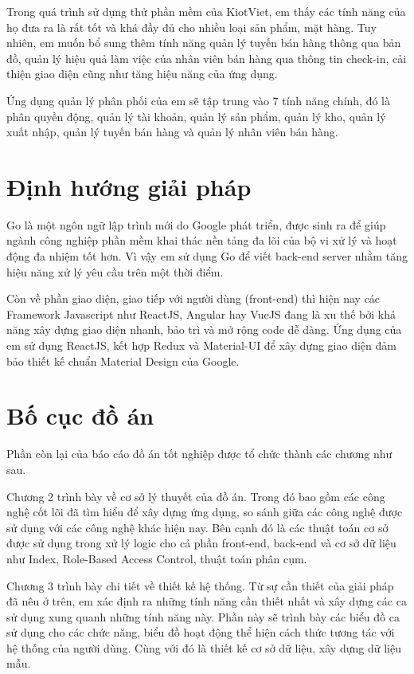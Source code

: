 Trong quá trình sử dụng thử phần mềm của KiotViet, em thấy các tính năng của
họ đưa ra là rất tốt và khá đầy đủ cho nhiều loại sản phẩm, mặt hàng.
Tuy nhiên, em muốn bổ sung thêm tính năng quản lý tuyến bán hàng
thông qua bản đồ, quản lý hiệu quả làm việc của nhân viên
bán hàng qua thông tin check-in, cải thiện giao diện cũng
như tăng hiệu năng của ứng dụng. 

Ứng dụng quản lý phân phối của em sẽ tập trung vào 7 tính năng chính,
đó là phân quyền động, quản lý tài khoản, quản lý sản phẩm, quản lý kho,
quản lý xuất nhập, quản lý tuyến bán hàng và quản lý nhân viên bán hàng.

\section{Định hướng giải pháp}
Go là một ngôn ngữ lập trình mới do Google phát triển,
được sinh ra để giúp ngành công nghiệp phần mềm khai thác nền
tảng đa lõi của bộ vi xử lý và hoạt động đa nhiệm tốt hơn.
Vì vậy em sử dụng Go để viết back-end server nhằm tăng hiệu
năng xử lý yêu cầu trên một thời điểm.

Còn về phần giao diện, giao tiếp với người dùng (front-end) thì hiện
nay các Framework Javascript như ReactJS, Angular hay VueJS đang
là xu thế bởi khả năng xây dựng giao diện nhanh, bảo trì và
mở rộng code dễ dàng. Ứng dụng của em sử dụng ReactJS, kết hợp Redux và
Material-UI để xây dựng giao diện đảm bảo thiết kế
chuẩn Material Design của Google. 

\section{Bố cục đồ án}
Phần còn lại của báo cáo đồ án tốt nghiệp được tổ
chức thành các chương như sau.

Chương 2 trình bày về cơ sở lý thuyết của đồ án. Trong đó bao gồm
các công nghệ cốt lõi đã tìm hiểu để xây dựng ứng dụng, so sánh
giữa các công nghệ được sử dụng với các công nghệ khác hiện nay.
Bên cạnh đó là các thuật toán cơ sở được sử dụng trong xử lý logic
cho cả phần front-end, back-end và cơ sở dữ liệu như Index,
Role-Based Access Control, thuật toán phân cụm. 

Chương 3 trình bày chi tiết về thiết kế hệ thống. Từ sự cần thiết
của giải pháp đã nêu ở trên, em xác định ra những tính năng cần thiết
nhất và xây dựng các ca sử dụng xung quanh những tính năng này.
Phần này sẽ trình bày các biểu đồ ca sử dụng cho các chức năng,
biểu đồ hoạt động thể hiện cách thức tương tác với hệ thống của
người dùng. Cùng với đó là thiết kế cơ sở dữ liệu, xây dựng dữ liệu mẫu.


